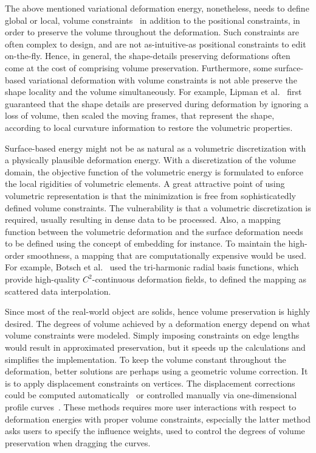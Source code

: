 The above mentioned variational deformation energy, nonetheless, needs to define global or local, volume constraints~\cite{Huang:2006:SGD,Ben-Chen:2009:VHM} in addition to the positional constraints, in order to preserve the volume throughout the deformation. Such constraints are often complex to design, and are not as-intuitive-as positional constraints to edit on-the-fly. Hence, in general, the shape-details preserving deformations often come at the cost of comprising volume preservation. Furthermore, some surface-based variational deformation with volume constraints is not able preserve the shape locality and the volume simultaneously. For example, Lipman et al.~\cite{Lipman:2007:VSP} first guaranteed that the shape details are preserved during deformation by ignoring a loss of volume, then scaled the moving frames, that represent the shape, according to local curvature information to restore the volumetric properties.

Surface-based energy might not be as natural as a volumetric discretization with a physically plausible deformation energy. With a discretization of the volume domain, the objective function of the volumetric energy is formulated to enforce the local rigidities of volumetric elements. A great attractive point of using volumetric representation is that the minimization is free from sophisticatedly defined volume constraints. The vulnerability is that a volumetric discretization is required, usually resulting in dense data to be processed. Also, a mapping function between the volumetric deformation and the surface deformation needs to be defined using the concept of embedding for instance. To maintain the high-order smoothness, a mapping that are computationally expensive would be used. For example, Botsch et al.~\cite{Botsch:2007:adaptive}  used the tri-harmonic radial basis functions, which provide high-quality $C^{2}$-continuous deformation fields, to defined the mapping as scattered data interpolation.

Since most of the real-world object are solids, hence volume preservation is highly desired. The degrees of volume achieved by a deformation energy depend on what volume constraints were modeled. Simply imposing constraints on edge lengths would result in approximated preservation, but it speeds up the calculations and simplifies the implementation. To keep the volume constant throughout the deformation, better solutions are perhaps using a geometric volume correction. It is to apply displacement constraints on vertices. The displacement corrections could be computed automatically~\cite{von:2008:volume} or controlled manually via one-dimensional profile curves~\cite{Rohmer:2009:EVP}. These methods requires more user interactions with respect to deformation energies with proper volume constraints, especially the latter method asks users to specify the influence weights, used to control the degrees of volume preservation when dragging the curves.







 